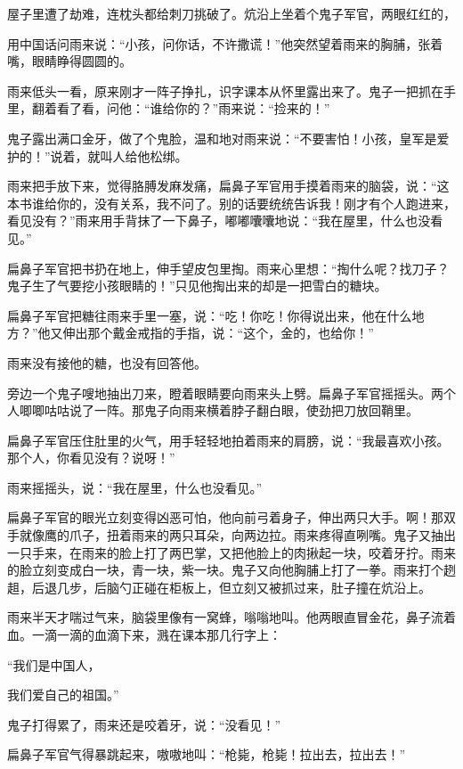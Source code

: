 \documentclass[12pt,UTF-8,openany]{ctexbook}
\begin{document}
\begin{large}
    屋子里遭了劫难，连枕头都给刺刀挑破了。炕沿上坐着个鬼子军官，两眼红红的，
    
    用中国话问雨来说：“小孩，问你话，不许撒谎！”他突然望着雨来的胸脯，张着嘴，眼睛睁得圆圆的。
    
    雨来低头一看，原来刚才一阵子挣扎，识字课本从怀里露出来了。鬼子一把抓在手里，翻着看了看，问他：“谁给你的？”雨来说：“捡来的！”
    
    鬼子露出满口金牙，做了个鬼脸，温和地对雨来说：“不要害怕！小孩，皇军是爱护的！”说着，就叫人给他松绑。
    
    雨来把手放下来，觉得胳膊发麻发痛，扁鼻子军官用手摸着雨来的脑袋，说：“这本书谁给你的，没有关系，我不问了。别的话要统统告诉我！刚才有个人跑进来，看见没有？”雨来用手背抹了一下鼻子，嘟嘟囔囔地说：“我在屋里，什么也没看见。”
    
    扁鼻子军官把书扔在地上，伸手望皮包里掏。雨来心里想：“掏什么呢？找刀子？鬼子生了气要挖小孩眼睛的！”只见他掏出来的却是一把雪白的糖块。
    
    扁鼻子军官把糖往雨来手里一塞，说：“吃！你吃！你得说出来，他在什么地方？”他又伸出那个戴金戒指的手指，说：“这个，金的，也给你！”
    
    雨来没有接他的糖，也没有回答他。
    
    旁边一个鬼子嗖地抽出刀来，瞪着眼睛要向雨来头上劈。扁鼻子军官摇摇头。两个人唧唧咕咕说了一阵。那鬼子向雨来横着脖子翻白眼，使劲把刀放回鞘里。
    
    扁鼻子军官压住肚里的火气，用手轻轻地拍着雨来的肩膀，说：“我最喜欢小孩。那个人，你看见没有？说呀！”
    
    雨来摇摇头，说：“我在屋里，什么也没看见。”
    
    扁鼻子军官的眼光立刻变得凶恶可怕，他向前弓着身子，伸出两只大手。啊！那双手就像鹰的爪子，扭着雨来的两只耳朵，向两边拉。雨来疼得直咧嘴。鬼子又抽出一只手来，在雨来的脸上打了两巴掌，又把他脸上的肉揪起一块，咬着牙拧。雨来的脸立刻变成白一块，青一块，紫一块。鬼子又向他胸脯上打了一拳。雨来打个趔趄，后退几步，后脑勺正碰在柜板上，但立刻又被抓过来，肚子撞在炕沿上。
    
    雨来半天才喘过气来，脑袋里像有一窝蜂，嗡嗡地叫。他两眼直冒金花，鼻子流着血。一滴一滴的血滴下来，溅在课本那几行字上：
    
    “我们是中国人，
    
    我们爱自己的祖国。”
    
    鬼子打得累了，雨来还是咬着牙，说：“没看见！”
    
    扁鼻子军官气得暴跳起来，嗷嗷地叫：“枪毙，枪毙！拉出去，拉出去！”
    

\end{large}
\end{document}
